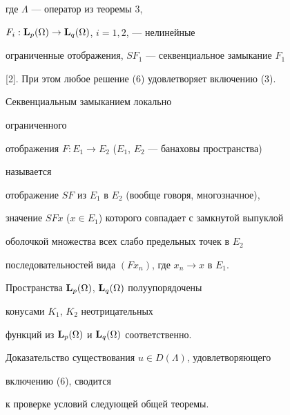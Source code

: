 где $\Lambda$ --- оператор из теоремы 3, 


$F_i:\bold L_p(\Omega)\to\bold L_q(\Omega)$, $i=1,2$, --- нелинейные 


ограниченные отображения, $S F_1$ --- секвенциальное замыкание $F_1$ 


[2]. При этом любое решение (6) удовлетворяет включению (3). 


 


\begin{defn}[{\myfont{}[2]}] Секвенциальным замыканием локально 


ограниченного 


отображения $F:E_1\to E_2$ ($E_1$, $E_2$ --- банаховы пространства) 


называется 


отображение $SF$ из $E_1$ в $E_2$ (вообще говоря, многозначное), 


значение $SFx$ ($x\in E_1$) которого совпадает с замкнутой выпуклой 


оболочкой множества всех слабо предельных точек в $E_2$ 


последовательностей вида $(Fx_n)$, где $x_n\to x$ в $E_1$. 


\end{defn} 


 


Пространства $\bold L_p(\Omega)$, $\bold L_q(\Omega)$ полуупорядочены 


конусами $K_1$, $K_2$ неотрицательных 


функций из $\bold L_p(\Omega)$ и $\bold L_q(\Omega)$ соответственно. 


Доказательство существования $u\in D(\Lambda)$, удовлетворяющего 


включению (6), сводится 


к проверке условий следующей общей теоремы. 


 


